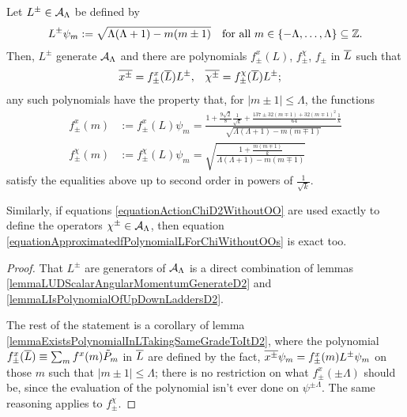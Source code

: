\begin{proposition}\label{propositionThereAreFunctionsfpmD2}
Let $L^\pm \in \mathcal A_{\Lambda}$ be defined by
\begin{align}
    L^\pm \psi_m &:= \sqrt{\Lambda(\Lambda + 1) - m(m \pm 1)}& \text{for all }m \in \{-\Lambda, \dots, \Lambda\}\subseteq \mathbb{Z}.
\end{align}
Then, $L^\pm$ generate $\mathcal A_\Lambda$ and there are polynomials $f^x_\pm(L)$, $f^\chi_\pm$, $f_\pm$ in $\overline{L}$ such that
\begin{align}
    \overline{x^\pm} &= f^x_{\pm}(\overline{L}) L^\pm,&
    \overline{\chi^\pm} &= f^\chi_{\pm}(\overline{L}) L^\pm;
\end{align}
any such polynomials have the property that, for $|m \pm 1| \leq \Lambda$, the functions
\begin{align}\label{equationApproximatedfPolynomialLForVanillaX}
    f^x_\pm(m) &:= f^x_\pm(L)\psi_m = \frac{1 + \frac{9\sqrt{2}}{8}\frac{1}{\sqrt{k}} + \frac{137 \pm 32(m \mp 1) + 32(m \mp 1)^2}{64}\frac{1}{k}}{\sqrt{\Lambda(\Lambda+1) - m(m \mp 1)}}\\
    \label{equationApproximatedfPolynomialLForChiWithoutOOs}
    f^\chi_\pm(m)&:= f^\chi_\pm(L)\psi_m = \sqrt{\frac{1 + \frac{m(m\mp 1)}{k}}{\Lambda(\Lambda+1) - m(m \mp 1)}}
\end{align}
satisfy the equalities above up to second order in powers of $\frac{1}{\sqrt{k}}$. 

Similarly, if equations \eqref{equationActionChiD2WithoutOO} are used exactly to define the operators $\chi^\pm \in \mathcal A_\Lambda$, then equation \eqref{equationApproximatedfPolynomialLForChiWithoutOOs} is exact too.
\end{proposition}
\begin{proof}
That $L^\pm$ are generators of $\mathcal A_\Lambda$ is a direct combination of lemmas \ref{lemmaLUDScalarAngularMomentumGenerateD2} and \ref{lemmaLIsPolynomialOfUpDownLaddersD2}.

The rest of the statement is a corollary of lemma \ref{lemmaExistsPolynomialInLTakingSameGradeToItD2}, where the polynomial $f^x_\pm(\overline{L})  \equiv \sum_m f^x(m) \tilde P_m$ in $\overline{L}$ are defined by the fact, $\overline{x^\pm} \psi_m = f^x_\pm(m) L^\pm \psi_m$ on those $m$ such that $|m \pm 1| \leq \Lambda$; there is no restriction on what $f^x_\pm(\pm \Lambda)$ should be, since the evaluation of the polynomial isn't ever done on $\psi^{\pm \Lambda}$. The same reasoning applies to $f^\chi_\pm$.
\end{proof}

